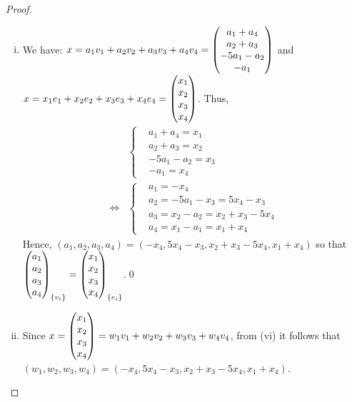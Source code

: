 \begin{proof}
\begin{enumerate}[(i)]
        Hence, we must have
        \begin{align*}
            &\begin{cases}
                &a_1+a_4=1\\
                &a_2+a_3=1\\
                &-5a_1-a_2=1\\
                &-a_1=1
            \end{cases}\\\iff
            &\begin{cases}
                &a_1=-1\\
                &a_2=-5a_1-1=4\\
                &a_3=1-a_2=-3\\
                &a_4=1-a_1=2
            \end{cases}
        \end{align*}
        Therefore, $(a_1,a_2,a_3,a_4)=(-1,4,-3,2)$ for $x=\ColVecFour{1}{1}{1}{1}_{\{e_i\}}=a_1v_1+a_2v_2+a_3v_3+a_4v_4$.\qed
        \item We have: $x=a_1v_1+a_2v_2+a_3v_3+a_4v_4=\begin{pmatrix} a_1+a_4\\ a_2+a_3\\-5a_1-a_2 \\ -a_1\end{pmatrix}$
        and $x=x_1e_1+x_2e_2+x_3e_3+x_4e_4=\begin{pmatrix} x_1\\ x_2\\x_3 \\ x_4\end{pmatrix}$.
        Thus,
        \begin{align*}
            &\begin{cases}
                &a_1+a_4=x_1\\
                &a_2+a_3=x_2\\
                &-5a_1-a_2=x_3\\
                &-a_1=x_4
            \end{cases}\\\iff
            &\begin{cases}
                &a_1=-x_4\\
                &a_2=-5a_1-x_3=5x_4-x_3\\
                &a_3=x_2-a_2=x_2+x_3-5x_4\\
                &a_4=x_1-a_1=x_1+x_4
            \end{cases}
        \end{align*}
        Hence, $(a_1,a_2,a_3,a_4)=(-x_4,5x_4-x_3,x_2+x_3-5x_4,x_1+x_4)$ so that $\begin{pmatrix} a_1\\ a_2\\a_3 \\ a_4\end{pmatrix}_{\{v_i\}}=\begin{pmatrix} x_1\\ x_2\\x_3 \\ x_4\end{pmatrix}_{\{e_i\}}$.\qed
        \item Since $x=\begin{pmatrix} x_1\\ x_2\\x_3 \\ x_4\end{pmatrix}=w_1v_1+w_2v_2+w_3v_3+w_4v_4$, from (vi) it follows that $(w_1,w_2,w_3,w_4)=(-x_4,5x_4-x_3,x_2+x_3-5x_4,x_1+x_4)$.

\end{enumerate}
\end{proof}
